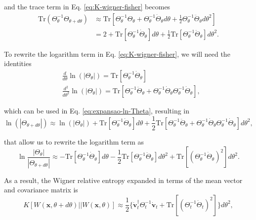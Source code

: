 \begin{apendicesenv}
\noindent and the trace term in Eq. \eqref{eq:K-wigner-fisher} becomes
\begin{align}
    \text{Tr}(\Theta_\theta^{-1} \Theta_{\theta+d\theta}) &\approx \text{Tr}\left[\Theta_\theta^{-1} \Theta_{\theta} + \Theta_\theta^{-1} \dot{\Theta}_{\theta} d\theta + \frac{1}{2} \Theta_\theta^{-1} \ddot{\Theta}_{\theta} d\theta^2 \right] \nonumber\\
    &= 2 + \text{Tr}\left[\Theta_\theta^{-1} \dot{\Theta}_{\theta} \right] d\theta + \frac{1}{2} \text{Tr}\left[\Theta_\theta^{-1} \ddot{\Theta}_{\theta} \right] d\theta^2.
\end{align}

\noindent To rewrite the logarithm term in Eq. \eqref{eq:K-wigner-fisher}, we will need the identities \cite{medina-2026}
\begin{align}
    &\frac{d}{d\theta} \ln(|\Theta_\theta|) = \text{Tr}\left[\Theta_\theta^{-1} \dot{\Theta}_{\theta} \right]\\
    &\frac{d^2}{d\theta^2} \ln(|\Theta_\theta|) = \text{Tr}\left[\Theta_\theta^{-1} \ddot{\Theta}_{\theta} + \Theta_\theta^{-1} \dot{\Theta}_{\theta}\Theta_\theta^{-1} \dot{\Theta}_{\theta} \right],
\end{align}

\noindent which can be used in Eq. \eqref{eq:expansao-ln-Theta}, resulting in
\begin{equation}
    \ln( |\Theta_{\theta+d\theta}|) \approx \ln( |\Theta_{\theta}|) + \text{Tr}\left[\Theta_\theta^{-1} \dot{\Theta}_{\theta} \right] d\theta + \frac{1}{2}\text{Tr}\left[\Theta_\theta^{-1} \ddot{\Theta}_{\theta} + \Theta_\theta^{-1} \dot{\Theta}_{\theta}\Theta_\theta^{-1} \dot{\Theta}_{\theta} \right]d\theta^2,
\end{equation}

\noindent that allow us to rewrite the logarithm term as
\begin{equation}
    \ln \frac{|\Theta_\theta|}{|\Theta_{\theta+d\theta}|} \approx -\text{Tr}\left[\Theta_\theta^{-1} \dot{\Theta}_{\theta} \right] d\theta - \frac{1}{2}\text{Tr}\left[\Theta_\theta^{-1} \ddot{\Theta}_{\theta}\right]d\theta^2 + \text{Tr}\left[(\Theta_\theta^{-1} \dot{\Theta}_{\theta})^2 \right]d\theta^2.
\end{equation}

\noindent As a result, the Wigner relative entropy expanded in terms of the mean vector and covariance matrix is
\begin{equation}
    K[W(\mathbf{x}, \theta+d\theta) || W(\mathbf{x}, \theta)] \approx \frac{1}{2} \{\dot{\mathbf{v}}_t^\dagger \Theta^{-1}_t \dot{\mathbf{v}}_t + \text{Tr}[(\Theta_t^{-1} \dot{\Theta}_t)^2]\} d\theta^2,
\end{equation}


\end{apendicesenv}
